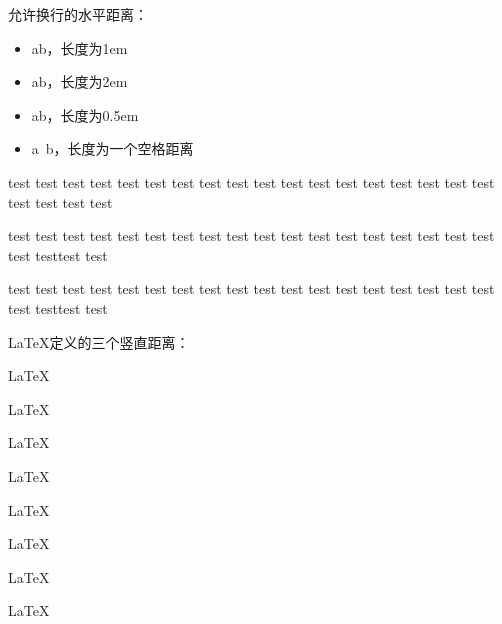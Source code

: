 \documentclass{ctexart}
\begin{document}
            允许换行的水平距离：
            \begin{itemize}
                \item a\quad b，长度为1em
                \item a\qquad b，长度为2em
                \item a\enskip b，长度为0.5em
                \item a\ b，长度为一个空格距离
            \end{itemize}

            test test test test test test test test test test test test test test test test test test test test test test

            test test test test test test test test test test test test test test test test test test test test\enspace test test 

            test test test test test test test test test test test test test test test test test test test test\enskip test test 

            LaTeX定义的三个竖直距离：

            \parbox[t]{.2\textwidth}{\LaTeX\par \LaTeX}
            \parbox[t]{.2\textwidth}{\LaTeX\par\smallskip \LaTeX}
            \parbox[t]{.2\textwidth}{\LaTeX\par\medskip \LaTeX}
            \parbox[t]{.2\textwidth}{\LaTeX\par\bigskip \LaTeX}
\end{document}
